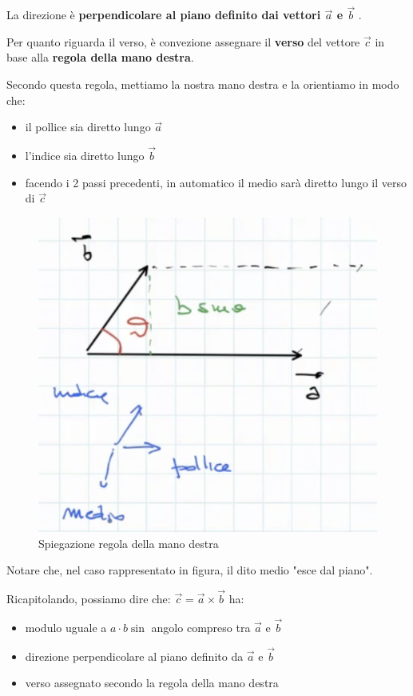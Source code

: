 La direzione è \textbf{perpendicolare al piano definito dai vettori $  \overrightarrow{a} $ e $ \overrightarrow{b} $} .

Per quanto riguarda il verso, è convezione assegnare il \textbf{verso} del vettore $ \overrightarrow{c} $ in base alla \textbf{regola della mano destra}.

Secondo questa regola,  mettiamo la nostra mano destra e la orientiamo in modo che:

\begin{itemize}
\item il pollice sia diretto lungo $ \overrightarrow{a} $
\item l'indice sia diretto lungo $ \overrightarrow{b} $
\item facendo i 2 passi precedenti, in automatico il medio sarà diretto lungo il verso di $ \overrightarrow{c} $
\end{itemize}

\newpage

\begin{figure}[h]
\begin{center}
\includegraphics[width = 0.5 \textwidth]{lezione1/images/manodx}
\caption{Spiegazione regola della mano destra}
\label{fig:manodx}
\end{center}
\end{figure}

Notare che, nel caso rappresentato in figura, il dito medio "esce dal piano".

Ricapitolando, possiamo dire che: $\overrightarrow{c} = \overrightarrow{a} \times \overrightarrow{b} $ ha:

\begin{itemize}
\item modulo uguale a $ a \cdot b \sin $ angolo compreso tra $ \overrightarrow{a} $ e $ \overrightarrow{b} $
\item direzione perpendicolare al piano definito da $ \overrightarrow{a} $ e $ \overrightarrow{b} $
\item verso assegnato secondo la regola della mano destra
\end{itemize}

